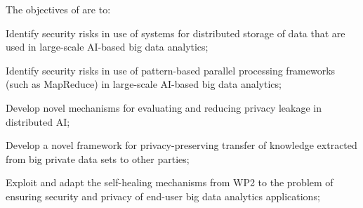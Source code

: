 \addtocounter{wpno}{1}
\begin{Workpackage}{\thewpno}
\WPTitle{\wpname{\thewpno}}

\begin{WPObjectives}
The objectives of \theWP{} are to:
\begin{compactitem}
\item Identify security risks in use of systems for distributed storage of data that are used in large-scale AI-based big data analytics;
\item Identify security risks in use of pattern-based parallel processing frameworks (such as MapReduce) in large-scale AI-based big data analytics;
\item Develop novel mechanisms for evaluating and reducing privacy leakage in distributed AI;
\item Develop a novel framework for privacy-preserving transfer of knowledge extracted from big private data sets to other parties;
\item Exploit and adapt the self-healing mechanisms from WP2 to the problem of ensuring security and privacy of end-user big data analytics applications;
\end{compactitem}
\end{WPObjectives}


\end{Workpackage}
